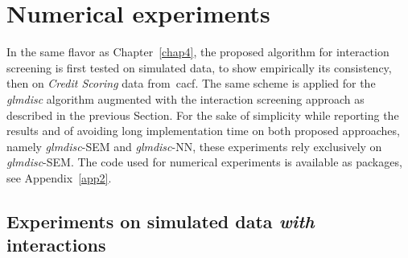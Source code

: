 \section{Numerical experiments}

In the same flavor as Chapter~\ref{chap4}, the proposed algorithm for interaction screening is first tested on simulated data, to show empirically its consistency, then on \textit{Credit Scoring} data from~\gls{cacf}. The same scheme is applied for the \textit{glmdisc} algorithm augmented with the interaction screening approach as described in the previous Section. For the sake of simplicity while reporting the results and of avoiding long implementation time on both proposed approaches, namely \textit{glmdisc}-SEM and \textit{glmdisc}-NN, these experiments rely exclusively on \textit{glmdisc}-SEM. The code used for numerical experiments is available as packages, see Appendix~\ref{app2}.

\subsection{Experiments on simulated data \textit{with} interactions}

